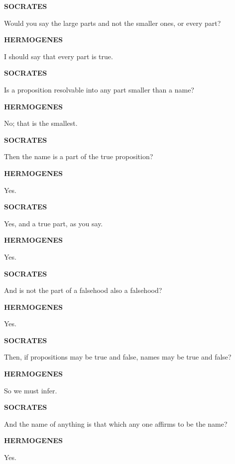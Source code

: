 \documentclass[11pt,letter]{article}
\begin{document}
\par \textbf{SOCRATES}
\par   Would you say the large parts and not the smaller ones, or every part?

\par \textbf{HERMOGENES}
\par   I should say that every part is true.

\par \textbf{SOCRATES}
\par   Is a proposition resolvable into any part smaller than a name?

\par \textbf{HERMOGENES}
\par   No; that is the smallest.

\par \textbf{SOCRATES}
\par   Then the name is a part of the true proposition?

\par \textbf{HERMOGENES}
\par   Yes.

\par \textbf{SOCRATES}
\par   Yes, and a true part, as you say.

\par \textbf{HERMOGENES}
\par   Yes.

\par \textbf{SOCRATES}
\par   And is not the part of a falsehood also a falsehood?

\par \textbf{HERMOGENES}
\par   Yes.

\par \textbf{SOCRATES}
\par   Then, if propositions may be true and false, names may be true and false?

\par \textbf{HERMOGENES}
\par   So we must infer.

\par \textbf{SOCRATES}
\par   And the name of anything is that which any one affirms to be the name?

\par \textbf{HERMOGENES}
\par   Yes.
\end{document}
